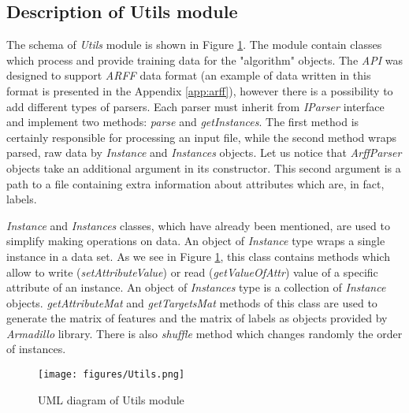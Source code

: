 \subsection{Description of Utils module}

The schema of \textit{Utils} module is shown in Figure \ref{fig:utils_sh}. The module contain classes which process and provide training data for the "algorithm" objects. The \textit{API} was designed to support \textit{ARFF} data format (an example of data written in this format is presented in the Appendix \ref{app:arff}), however there is a possibility to add different types of parsers. Each parser must inherit from \textit{IParser} interface and implement two methods: \textit{parse} and \textit{getInstances}. The first method is certainly responsible for processing an input file, while the second method wraps parsed, raw data by \textit{Instance} and \textit{Instances} objects. Let us notice that \textit{ArffParser} objects take an additional argument in its constructor. This second argument is a path to a file containing extra information about attributes which are, in fact, labels.

\textit{Instance} and \textit{Instances} classes, which have already been mentioned, are used to simplify making operations on data. An object of \textit{Instance} type wraps a single instance in a data set. As we see in Figure \ref{fig:utils_sh}, this class contains methods which allow to write (\textit{setAttributeValue}) or read (\textit{getValueOfAttr}) value of a specific attribute of an instance. An object of \textit{Instances} type is a collection of \textit{Instance} objects. \textit{getAttributeMat} and \textit{getTargetsMat} methods of this class are used to generate the matrix of features and the matrix of labels as objects provided by \textit{Armadillo} library. There is also \textit{shuffle} method which changes randomly the order of instances.  

\begin{figure}
\centering
\caption{UML diagram of Utils module}
\label{fig:utils_sh}
\texttt{[image: figures/Utils.png]}
\end{figure}

